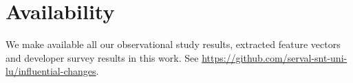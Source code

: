 \section*{Availability}
\makeatletter
\g@addto@macro{\UrlBreaks}{\UrlOrds}
\makeatother
We make available all our observational study results, extracted feature vectors and developer survey results in this work.
See \url{https://github.com/serval-snt-uni-lu/influential-changes}.
